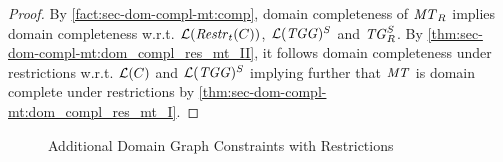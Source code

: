 \begin{proof}
By \cref{fact:sec-dom-compl-mt:comp}, domain completeness of $\mathit{MT}_R$ implies domain completeness w.r.t. $\mathcal{L}(\mathit{Restr}_t(C))$, $\mathcal{L}(\mathit{TGG})^S$ and $\mathit{TG}^S_R$.
By \cref{thm:sec-dom-compl-mt:dom_compl_res_mt_II}, it follows domain completeness under restrictions w.r.t. $\mathcal{L}(C)$ and $\mathcal{L}(\mathit{TGG})^S$ implying further that $\mathit{MT}$ is domain complete under restrictions by \cref{thm:sec-dom-compl-mt:dom_compl_res_mt_I}.
\end{proof}

\begin{figure}[!tb]
\begin{center}
\end{center}
\caption{Additional Domain Graph Constraints with Restrictions}
\label{fig:sec-dom-compl-mt:constraints}
\end{figure}

